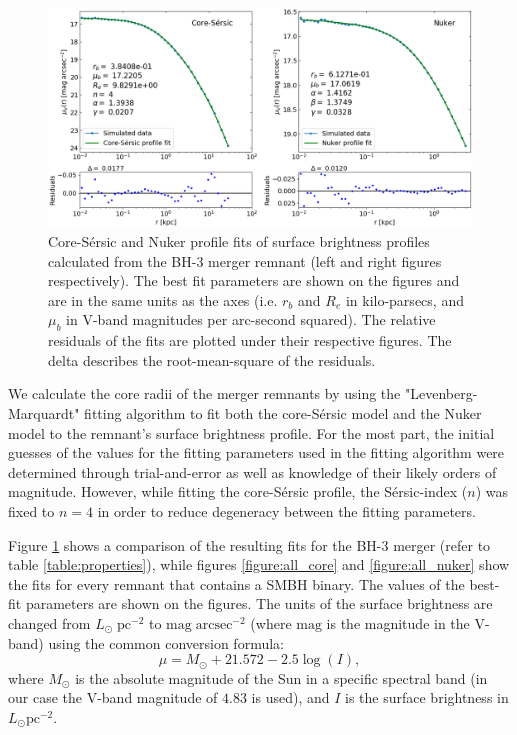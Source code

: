 \documentclass[english, oneside]{HYgradu}
\begin{document}
\begin{figure}[h]
	\centering
	\includegraphics[width=\textwidth]{core_nuker_fits.png}
	\caption{Core-Sérsic and Nuker profile fits of surface brightness profiles calculated from the BH-3 merger remnant (left and right figures respectively). The best fit parameters are shown on the figures and are in the same units as the axes (i.e. $r_b$ and $R_e$ in kilo-parsecs, and $\mu_b$ in V-band magnitudes per arc-second squared). The relative residuals of the fits are plotted under their respective figures. The delta describes the root-mean-square of the residuals.}
	\label{figure:core_nuker}
\end{figure}

We calculate the core radii of the merger remnants by using the "Levenberg-Marquardt" fitting algorithm to fit both the core-Sérsic model and the Nuker model to the remnant's surface brightness profile. For the most part, the initial guesses of the values for the fitting parameters used in the fitting algorithm were determined through trial-and-error as well as knowledge of their likely orders of magnitude. However, while fitting the core-Sérsic profile, the Sérsic-index ($n$) was fixed to $n=4$ in order to reduce degeneracy between the fitting parameters.

Figure \ref{figure:core_nuker} shows a comparison of the resulting fits for the BH-3 merger (refer to table \ref{table:properties}), while figures \ref{figure:all_core} and \ref{figure:all_nuker} show the fits for every remnant that contains a SMBH binary. The values of the best-fit parameters are shown on the figures. The units of the surface brightness are changed from $L_\odot \; \mathrm{pc^{-2}}$ to $\mathrm{mag \; arcsec^{-2}}$ (where $\mathrm{mag}$ is the magnitude in the V-band) using the common conversion formula:
\begin{equation}
\mu = M_\odot + 21.572 - 2.5 \log(I), 
\end{equation}
where $M_\odot$ is the absolute magnitude of the Sun in a specific spectral band (in our case the V-band magnitude of $4.83$ is used), and $I$ is the surface brightness in $L_\odot \mathrm{pc^{-2}}$.
\end{document}

